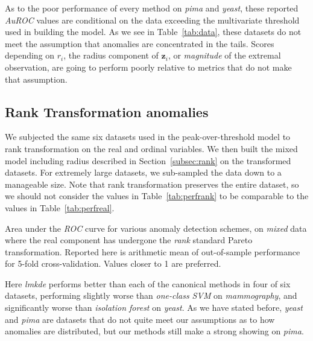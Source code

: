 As to the poor performance of every method on \emph{pima} and \emph{yeast}, 
    these reported \emph{AuROC} values are conditional on the data exceeding 
    the multivariate threshold used in building the model.  As we see in 
    Table~\ref{tab:data}, these datasets do not meet the assumption that 
    anomalies are concentrated in the tails.  Scores depending on $r_i$, the
    radius component of $\bm{z}_i$, or \emph{magnitude} of the extremal 
    observation, are going to perform poorly relative to metrics that do not 
    make that assumption.

\subsection{Rank Transformation anomalies}
We subjected the same six datasets used in the peak-over-threshold model to 
    rank transformation on the real and ordinal variables. We then built the 
    mixed model including radius described in Section~\ref{subsec:rank} on the 
    transformed datasets.  For extremely large datasets, we sub-sampled the 
    data down to a manageable size.
    Note that rank transformation preserves the entire dataset, so we should 
    not consider the values in Table~\ref{tab:perfrank} to be comparable to 
    the values in Table~\ref{tab:perfreal}.
    
\begin{table}[ht]
    \centering
    \caption{Area under the \emph{ROC} curve for various anomaly detection 
        schemes, on \emph{mixed} data where the real component has undergone 
        the \emph{rank} standard Pareto transformation. Reported here is 
        arithmetic mean of out-of-sample performance for 5-fold 
        cross-validation.  Values closer to 1 are preferred.
        \label{tab:perfrank}}
    \bigskip
    
\end{table}

Here \emph{lmkde} performs better than each of the canonical methods in four of 
    six datasets, performing slightly worse than \emph{one-class SVM} on 
    \emph{mammography}, and significantly worse than \emph{isolation forest} on 
    \emph{yeast}.  As we have stated before, \emph{yeast} and \emph{pima} are 
    datasets that do not quite meet our assumptions as to how anomalies are 
    distributed, but our methods still make a strong showing on \emph{pima}.
    

